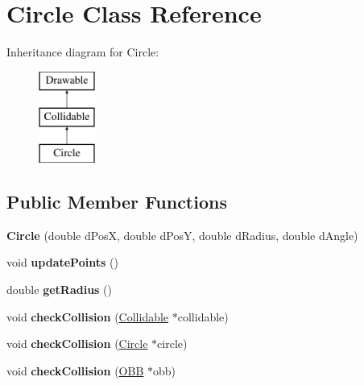\hypertarget{class_circle}{}\section{Circle Class Reference}
\label{class_circle}
Inheritance diagram for Circle\+:\begin{figure}[H]
\begin{center}
\leavevmode
\includegraphics[height=3.000000cm]{class_circle}
\end{center}
\end{figure}
\subsection*{Public Member Functions}
\begin{DoxyCompactItemize}
\item 
\hypertarget{class_circle_a37bc287e0f72d8609f64074337cd4a81}{}{\bfseries Circle} (double d\+Pos\+X, double d\+Pos\+Y, double d\+Radius, double d\+Angle)\label{class_circle_a37bc287e0f72d8609f64074337cd4a81}

\item 
\hypertarget{class_circle_afe23c30a1bbc5e831b72063aef91b38f}{}void {\bfseries update\+Points} ()\label{class_circle_afe23c30a1bbc5e831b72063aef91b38f}

\item 
\hypertarget{class_circle_af9fccec77d3a15d63594666dc8501437}{}double {\bfseries get\+Radius} ()\label{class_circle_af9fccec77d3a15d63594666dc8501437}

\item 
\hypertarget{class_circle_a7b23c1ed107b8a309fc1c5d0f6635ae9}{}void {\bfseries check\+Collision} (\hyperlink{class_collidable}{Collidable} $\ast$collidable)\label{class_circle_a7b23c1ed107b8a309fc1c5d0f6635ae9}

\item 
\hypertarget{class_circle_ad528dfc586b5a46b11401abf52d8da87}{}void {\bfseries check\+Collision} (\hyperlink{class_circle}{Circle} $\ast$circle)\label{class_circle_ad528dfc586b5a46b11401abf52d8da87}

\item 
\hypertarget{class_circle_a328f1400d819209db7b64431b60bbc59}{}void {\bfseries check\+Collision} (\hyperlink{class_o_b_b}{O\+B\+B} $\ast$obb)\label{class_circle_a328f1400d819209db7b64431b60bbc59}

\end{DoxyCompactItemize}
